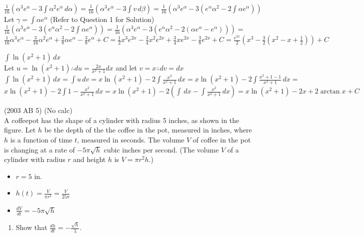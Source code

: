 \documentclass[10pt, letterpaper]{report}
\begin{document}
\begin{enumerate}
{    $\frac{1}{16}\left(\alpha^{3}e^{\alpha}-3\int{\alpha^{2}e^{\alpha}}\,d\alpha\right)=
    \frac{1}{16}\left(\alpha^{3}e^{\alpha}-3\int{v}\,d\beta\right)=
    \frac{1}{16}\left(\alpha^{3}e^{\alpha}-3\left(e^{\alpha}\alpha^{2}-2\int{\alpha e^{\alpha}}\right)\right)$ \\

    Let $\gamma=\int{\alpha e^{\alpha}}$ (Refer to Question 1 for Solution) \\

    $\frac{1}{16}\left(\alpha^{3}e^{\alpha}-3\left(e^{\alpha}\alpha^{2}-2\int{\alpha e^{\alpha}}\right)\right)=
    \frac{1}{16}\left(\alpha^{3}e^{\alpha}-3\left(e^{\alpha}\alpha^{2}-2\left(\alpha e^{\alpha}-e^{\alpha}\right)\right)\right)=$ \\

    $\frac{1}{16}\alpha^{3}e^{\alpha}-\frac{3}{16}\alpha^{2}e^{\alpha}+\frac{3}{8}\alpha e^{\alpha}-\frac{3}{8}e^{\alpha}+C=
    \frac{1}{2}x^{3}e^{2x}-\frac{3}{4}x^{2}e^{2x}+\frac{3}{4}xe^{2x}-\frac{3}{8}e^{2x}+C=\frac{e^{2x}}{2}\left(x^3-\frac{3}{2}\left(x^2-x+\frac{1}{2}\right)\right)+C$ \\

  \item{$\int{\ln{(x^{2}+1)}}\,dx$} \\

    Let $u=\ln{(x^{2}+1)}\therefore du=\frac{2x}{x^{2}+1}dx$ and let $v=x\therefore dv=dx$ \\

    $\int{\ln{(x^{2}+1)}}\,dx=\int{u}\,dv=x\ln{(x^{2}+1)}-2\int{\frac{x^{2}}{x^{2}+1}}\,dx=
    x\ln{(x^{2}+1)}-2\int{\frac{x^{2}+1-1}{x^{2}+1}}\,dx=$ \\

    $x\ln{(x^{2}+1)}-2\int{1-\frac{x^{2}}{x^{2}+1}}\,dx=
    x\ln{(x^{2}+1)}-2\left(\int{}\,dx-\int{\frac{x^{2}}{x^{2}+1}}\,dx\right)=
    x\ln{(x^{2}+1)}-2x+2\arctan{x}+C$ \\

  \pagebreak
  \item{(2003 AB 5) (No calc)} \\
    A coffeepot has the shape of a cylinder with radius 5 inches, as shown in the figure. Let $h$ be the depth of the the coffee in the pot, measured in inches, where $h$ is a function of time $t$, measured in seconds. The volume $V$ of coffee in the pot is changing at a rate of $-5\pi\sqrt{h}$ cubic inches per second. (The volume $V$ of a cylinder with radius $r$ and height $h$ is $V=\pi r^{2}h$.)
    \begin{itemize}
      \item{$r=5$ in.}
      \item{$h(t)=\frac{V}{\pi r^{2}}=\frac{V}{25\pi}$}
      \item{$\frac{dV}{dt}=-5\pi\sqrt{h}$}
    \end{itemize}
    \begin{enumerate}
      \item{Show that $\frac{dh}{dt}=-\frac{\sqrt{h}}{5}$.} \\


\end{enumerate}}
\end{enumerate}
\end{document}
